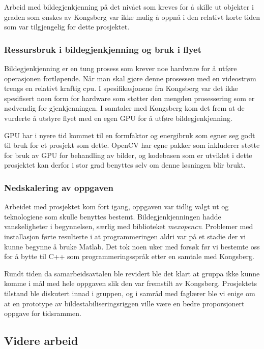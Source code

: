 Arbeid med bildegjenkjenning på det nivået som kreves for å skille ut objekter i graden som ønskes av Kongsberg var ikke mulig å oppnå i den relativt korte tiden som var tilgjengelig for dette prosjektet.


\subsubsection{Ressursbruk i bildegjenkjenning og bruk i flyet}

Bildegjenkjenning er en tung prosess som krever noe hardware for å utføre operasjonen fortløpende. Når man skal gjøre denne prosessen med en videostrøm trengs en relativt kraftig cpu. I spesifikasjonene fra Kongsberg \cite{LocalHawkPDF} var det ikke spesifisert noen form for hardware som støtter den mengden prosessering som er nødvendig for gjenkjenningen. I samtaler med Kongsberg kom det frem at de vurderte å utstyre flyet med en egen GPU for å utføre bildegjenkjenning. 



GPU har i nyere tid kommet til en formfaktor og energibruk som egner seg godt til bruk for et prosjekt som dette. OpenCV har egne pakker som inkluderer støtte for bruk av GPU for behandling av bilder, og kodebasen som er utviklet i dette prosjektet kan derfor i stor grad benyttes selv om denne løsningen blir brukt.


\subsubsection{Nedskalering av oppgaven}
Arbeidet med prosjektet kom fort igang, oppgaven var tidlig valgt ut og teknologiene som skulle benyttes bestemt. Bildegjenkjenningen hadde vanskeligheter i begynnelsen, særlig med biblioteket \emph{mexopencv}. Problemer med installasjon førte resulterte i at programmeringen aldri var på et stadie der vi kunne begynne å bruke Matlab. Det tok noen uker med forsøk før vi bestemte oss for å bytte til C++ som programmeringsspråk etter en samtale med Kongsberg.

Rundt tiden da samarbeidsavtalen ble revidert ble det klart at gruppa ikke kunne komme i mål med hele oppgaven slik den var fremstilt av Kongsberg. Prosjektets tilstand ble diskutert innad i gruppen, og i samråd med faglærer ble vi enige om at en prototype av bildestabiliseringsriggen ville være en bedre proporsjonert oppgave for tidsrammen.



\subsection{Videre arbeid}



